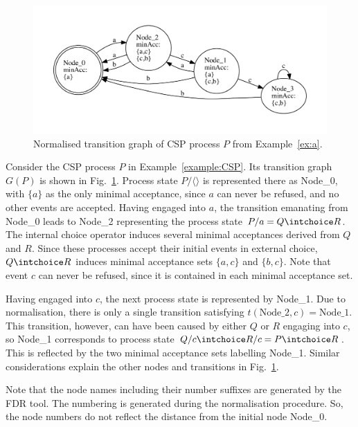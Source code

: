  \begin{figure}[t]
   \begin{center}
     \includegraphics[width=\textwidth]{q0.pdf}
   \end{center}
   \caption{Normalised transition graph of CSP process $P$ from Example~\ref{ex:a}.}
   \label{fig:tga}
 \end{figure}

\begin{example}\label{ex:a}
Consider the CSP process $P$ in Example~\ref{example:CSP}. Its transition
graph $G(P)$ is shown in Fig.~\ref{fig:tga}. Process state $P/\langle\rangle$
is represented there as Node\_0, with $\{ a\}$ as the only minimal
acceptance, since $a$ can never be refused, and no other events are accepted.
Having engaged into $a$, the transition emanating from Node\_0 leads to
Node\_2 representing  the process state $P/a = Q\intchoice R$. The internal
choice operator induces several minimal acceptances derived from $Q$ and $R$.
Since these processes accept their initial events in external choice,
$Q\intchoice R$ induces minimal acceptance sets $\{a,c\}$ and $\{b,c\}$. Note
that event $c$ can never be refused, since it is contained in each minimal
acceptance set.

Having engaged into $c$, the next process state is represented by Node\_1.
Due to normalisation, there is only a single transition satisfying
$t(\text{Node\_2},c) = \text{Node\_1}$. This transition, however, can have
been caused by either $Q$ or $R$ engaging into $c$, so Node\_1 corresponds to
process state $Q/c \intchoice R/c = P \intchoice R$. This is reflected by the
two minimal acceptance sets labelling Node\_1.
Similar considerations explain the other nodes and transitions in
Fig.~\ref{fig:tga}.

Note that the node names including their number suffixes are generated by the
FDR tool. The numbering is generated during the normalisation procedure. So,
the node numbers do not reflect the distance from the initial node Node\_0.
\xbox
\end{example}

